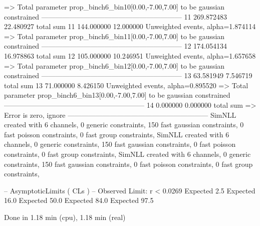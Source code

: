   => Total parameter prop_binch6_bin10[0.00,-7.00,7.00] to be gaussian constrained
------------------------------------------------------------
11         269.872483      22.480927       total sum                     
11         144.000000      12.000000       Unweighted events, alpha=1.874114
  => Total parameter prop_binch6_bin11[0.00,-7.00,7.00] to be gaussian constrained
------------------------------------------------------------
12         174.054134      16.978863       total sum                     
12         105.000000      10.246951       Unweighted events, alpha=1.657658
  => Total parameter prop_binch6_bin12[0.00,-7.00,7.00] to be gaussian constrained
------------------------------------------------------------
13         63.581949       7.546719        total sum                     
13         71.000000       8.426150        Unweighted events, alpha=0.895520
  => Total parameter prop_binch6_bin13[0.00,-7.00,7.00] to be gaussian constrained
------------------------------------------------------------
14         0.000000        0.000000        total sum                     
  => Error is zero, ignore      
------------------------------------------------------------
SimNLL created with 6 channels, 0 generic constraints, 150 fast gaussian constraints, 0 fast poisson constraints, 0 fast group constraints, 
SimNLL created with 6 channels, 0 generic constraints, 150 fast gaussian constraints, 0 fast poisson constraints, 0 fast group constraints, 
SimNLL created with 6 channels, 0 generic constraints, 150 fast gaussian constraints, 0 fast poisson constraints, 0 fast group constraints, 

 -- AsymptoticLimits ( CLs ) --
Observed Limit: r < 0.0269
Expected  2.5%
Expected 16.0%
Expected 50.0%
Expected 84.0%
Expected 97.5%

Done in 1.18 min (cpu), 1.18 min (real)
